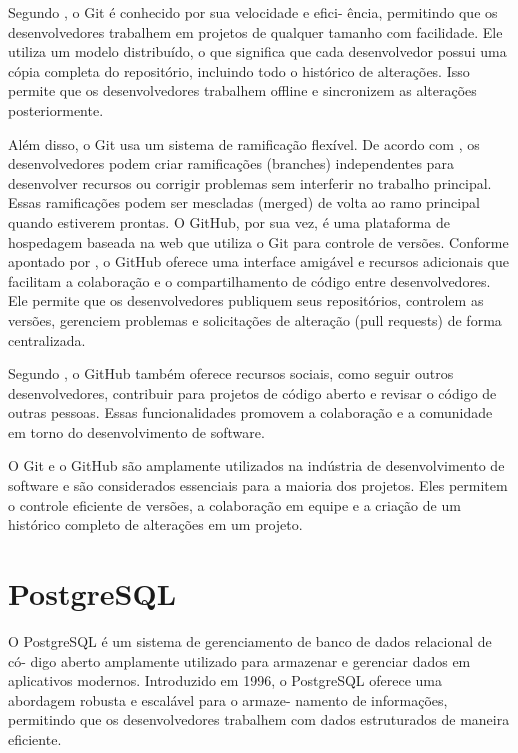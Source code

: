 Segundo \cite{Chacon2014}, o Git é conhecido por sua velocidade e efici-
ência, permitindo que os desenvolvedores trabalhem em projetos de qualquer tamanho com
facilidade. Ele utiliza um modelo distribuído, o que significa que cada desenvolvedor possui
uma cópia completa do repositório, incluindo todo o histórico de alterações. Isso permite que os
desenvolvedores trabalhem offline e sincronizem as alterações posteriormente.

Além disso, o Git usa um sistema de ramificação flexível.
De acordo com \cite{Loeliger2012}, os desenvolvedores podem criar ramificações (branches) independentes para desenvolver
recursos ou corrigir problemas sem interferir no trabalho principal.
Essas ramificações podem
ser mescladas (merged) de volta ao ramo principal quando estiverem prontas.
O GitHub, por sua vez, é uma plataforma de hospedagem baseada na web que utiliza o Git
para controle de versões.
Conforme apontado por \cite{Dabbish2012}, o GitHub oferece uma
interface amigável e recursos adicionais que facilitam a colaboração e o compartilhamento de
código entre desenvolvedores.
Ele permite que os desenvolvedores publiquem seus repositórios,
controlem as versões, gerenciem problemas e solicitações de alteração (pull requests) de forma
centralizada.

Segundo \cite{Chacon2016}, o GitHub também oferece recursos sociais, como
seguir outros desenvolvedores, contribuir para projetos de código aberto e revisar o código de
outras pessoas.
Essas funcionalidades promovem a colaboração e a comunidade em torno do
desenvolvimento de software.

O Git e o GitHub são amplamente utilizados na indústria de desenvolvimento de software
e são considerados essenciais para a maioria dos projetos. Eles permitem o controle eficiente
de versões, a colaboração em equipe e a criação de um histórico completo de alterações em um
projeto.

\section{PostgreSQL}

O PostgreSQL é um sistema de gerenciamento de banco de dados relacional de có-
digo aberto amplamente utilizado para armazenar e gerenciar dados em aplicativos modernos.
Introduzido em 1996, o PostgreSQL oferece uma abordagem robusta e escalável para o armaze-
namento de informações, permitindo que os desenvolvedores trabalhem com dados estruturados
de maneira eficiente.

